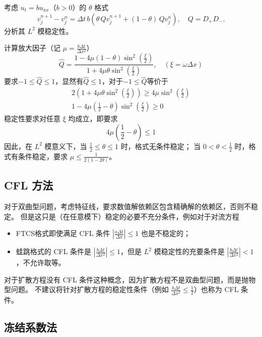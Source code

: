 \begin{example}\label{eg:theta-1}
    考虑 $u_t = b u_{xx}$（$b > 0$）的 $\theta$ 格式
    \[
        v^{n+1}_j - v^n_j = \Delta t\, b(\theta\,Q v^{n+1}_j+(1-\theta)\, Q v^n_j),\quad Q = D_+ D_-.
    \]
    分析其 $L^2$ 模稳定性。
\end{example}

\begin{solution*}
    计算放大因子（记 $\mu = \frac{b \Delta t}{\Delta x^2}$）
    \[
        \widehat{Q} = \frac{1-4\mu(1-\theta)\sin^2(\frac{\xi}2)}{1+4\mu\theta\sin^2(\frac{\xi}2)},\quad (\xi = \omega \Delta x)
    \]
    要求$-1 \le \widehat{Q} \le 1$，显然有$\widehat{Q}\le 1$，对于$-1 \le \widehat{Q}$等价于
    \begin{gather*}
        2\left(1+4\mu \theta \sin^2(\frac{\xi}2)\right) \ge 4 \mu \sin^2(\frac{\xi}2)
        \\
        1 -  4\mu(\frac12-\theta) \sin^2(\frac{\xi}2) \ge 0
    \end{gather*}
    稳定性要求对任意 $\xi$ 均成立，即要求
    \[
        4\mu(\frac12-\theta) \le 1
    \]
    因此，在 $L^2$ 模意义下，当 $\frac12 \le \theta \le 1$ 时，格式无条件稳定；
    当 $0 <\theta < \frac12$ 时，格式有条件稳定，要求 $\mu \le \frac{1}{2(1-2\theta)}$。
\end{solution*}

\subsection{CFL 方法}

对于双曲型问题，考虑特征线，要求数值解依赖区包含精确解的依赖区，否则不稳定。
但是这只是（在任意模下）稳定的必要不充分条件，例如对于对流方程
\begin{itemize}
    \item FTCS格式即使满足 CFL 条件 $|\frac{a \Delta t}{\Delta x}| \le 1$ 也是不稳定的；
    \item 蛙跳格式的 CFL 条件是 $|\frac{b \Delta t}{\Delta x^2}| \le 1$，但是 $L^2$ 模稳定性的充要条件是 $|\frac{b \Delta t}{\Delta x^2}| < 1$，不允许取等。
\end{itemize}

\begin{remark}
    对于扩散方程没有 CFL 条件这种概念，因为扩散方程不是双曲型问题，而是抛物型问题。
    不建议将针对扩散方程的稳定性条件（例如 $\frac{b \Delta t}{\Delta x^2} \le \frac12$）也称为 CFL 条件。
\end{remark}


\subsection{冻结系数法}

